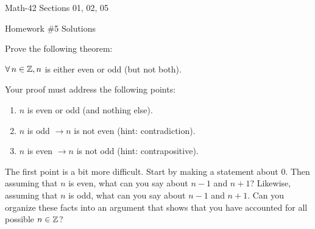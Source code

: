 \documentclass[letterpaper,12pt,fleqn]{article}
\renewcommand{\implies}{\rightarrow}
\begin{document}
\begin{center}
  \large
  Math-42 Sections 01, 02, 05

  \Large
  Homework \#5 Solutions

\end{center}

Prove the following theorem:

\begin{theorem}
  \(\forall\,n\in\mathbb{Z},n\) is either even or odd (but not both).
\end{theorem}

Your proof must address the following points:
\begin{enumerate}
\item \(n\) is even or odd (and nothing else).
\item \(n\) is odd \(\implies n\) is not even (hint: contradiction).
\item \(n\) is even \(\implies n\) is not odd (hint: contrapositive).
\end{enumerate}

The first point is a bit more difficult.  Start by making a statement about 0.  Then assuming that \(n\) is even,
what can you say about \(n-1\) and \(n+1\)?  Likewise, assuming that \(n\) is odd, what can you say about \(n-1\)
and \(n+1\).  Can you organize these facts into an argument that shows that you have accounted for all possible
\(n\in\mathbb{Z}\)?
\end{document}

